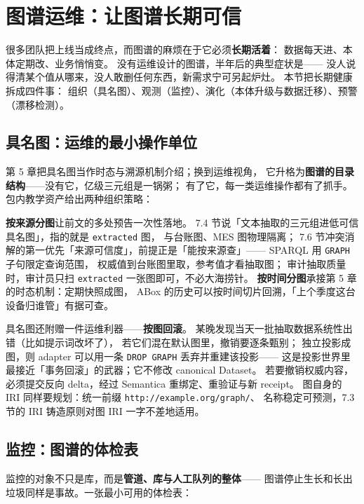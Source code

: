 \section{图谱运维：让图谱长期可信}

很多团队把上线当成终点，而图谱的麻烦在于它必须\textbf{长期活着}：
数据每天进、本体定期改、业务悄悄变。
没有运维设计的图谱，半年后的典型症状是——
没人说得清某个值从哪来，没人敢删任何东西，新需求宁可另起炉灶。
本节把长期健康拆成四件事：
组织（具名图）、观测（监控）、演化（本体升级与数据迁移）、预警（漂移检测）。

\subsection{具名图：运维的最小操作单位}

第 5 章把具名图当作时态与溯源机制介绍；换到运维视角，
它升格为\textbf{图谱的目录结构}——没有它，亿级三元组是一锅粥；
有了它，每一类运维操作都有了抓手。包内教学资产给出两种组织策略：



\textbf{按来源分图}让前文的多处预告一次性落地。
7.4 节说「文本抽取的三元组进低可信具名图」，指的就是 \texttt{extracted} 图，
与台账图、MES 图物理隔离；
7.6 节冲突消解的第一优先「来源可信度」，前提正是「能按来源查」——
SPARQL 用 \texttt{GRAPH} 子句限定查询范围，
权威值到台账图里取，参考值才看抽取图；
审计抽取质量时，审计员只扫 \texttt{extracted} 一张图即可，不必大海捞针。
\textbf{按时间分图}承接第 5 章的时态机制：定期快照成图，
ABox 的历史可以按时间切片回溯，「上个季度这台设备归谁管」有据可查。

具名图还附赠一件运维利器——\textbf{按图回滚}。
某晚发现当天一批抽取数据系统性出错（比如提示词改坏了），
若它们混在默认图里，撤销要逐条甄别；
独立投影成图，则 adapter 可以用一条 \texttt{DROP GRAPH} 丢弃并重建该投影——
这是投影世界里最接近「事务回滚」的武器；它不修改 canonical Dataset。
若要撤销权威内容，必须提交反向 delta，经过 Semantica 重绑定、重验证与新 receipt。
图自身的 IRI 同样要规划：统一前缀 \texttt{http://example.org/graph/}、
名称稳定可预测，7.3 节的 IRI 铸造原则对图 IRI 一字不差地适用。

\subsection{监控：图谱的体检表}

监控的对象不只是库，而是\textbf{管道、库与人工队列的整体}——
图谱停止生长和长出垃圾同样是事故。一张最小可用的体检表：

